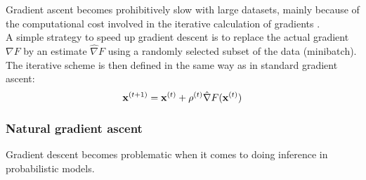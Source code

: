 Gradient ascent becomes prohibitively slow with large datasets, mainly because of the computational cost involved in the iterative calculation of gradients \cite{Spall2003}.\\
A simple strategy to speed up gradient descent is to replace the actual gradient $\nabla F$ by an estimate $\hat{\nabla} F$ using a randomly selected subset of the data (minibatch).
The iterative scheme is then defined in the same way as in standard gradient ascent:
\begin{equation}
	{\bf x}^{(t+1)} = {\bf x}^{(t)} + \rho^{(t)} \hat{\nabla} F({\bf x}^{(t)})
\end{equation}




\subsubsection{Natural gradient ascent} \label{section:natural_gradient_ascent}

Gradient descent becomes problematic when it comes to doing inference in probabilistic models. 

